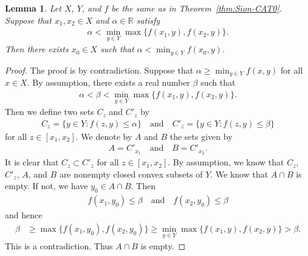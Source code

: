 \documentclass[draft]{amsart}
\numberwithin{equation}{section}
\def\R{\mathbb R}
\theoremstyle{plain}
\newtheorem{lemma}[theorem]{Lemma}
\theoremstyle{definition}
\theoremstyle{remark}
\begin{document}
\begin{lemma}\label{lem:Sion-CAT0-1}
 Let $X$, $Y$, and $f$ be the same as in Theorem~\ref{thm:Sion-CAT0}. 
 Suppose that $x_1,x_2\in X$ and $\alpha \in \R$ satisfy 
 \begin{align}
  \alpha < \min_{y\in Y}\max\{f(x_1, y), f(x_2, y)\}. 
 \end{align}
 Then there exists $x_0\in X$ such that 
 $\alpha < \min_{y\in Y}f(x_0,y)$. 
\end{lemma}

\begin{proof}
 The proof is by contradiction. Suppose that 
 $\alpha \geq \min_{y\in Y}f(x, y)$ 
 for all $x\in X$. 
 By assumption, there exists a real number $\beta$ such that 
 \begin{align}
  \alpha < \beta < \min_{y\in Y}\max\{f(x_1, y), f(x_2, y)\}. 
 \end{align}
 Then we define two sets $C_z$ and $C'_z$ by 
 \begin{align}
  C_z = \{y\in Y: f(z,y) \leq \alpha\} 
  \quad \textrm{and} \quad 
  C'_z = \{y\in Y: f(z,y) \leq \beta\} 
 \end{align}
 for all $z\in [x_1,x_2]$. We denote by $A$ and $B$ the sets given by 
 \begin{align}
  A=C'_{x_1} \quad \textrm{and}\quad B=C'_{x_2}. 
 \end{align}
 It is clear that $C_z\subset C'_z$ for all $z\in [x_1,x_2]$. 
 By assumption, we know that $C_z$, $C'_z$, $A$, and $B$ are 
 nonempty closed convex subsets of $Y$. 
 We know that $A\cap B$ is empty. 
 If not, we have $y_0\in A\cap B$. Then 
\begin{align}
 f(x_1,y_0)\leq \beta \quad \textrm{and} \quad 
 f(x_2,y_0) \leq \beta
\end{align}
 and hence 
 \begin{align}
  \beta 
& \geq \max \{f(x_1,y_0), f(x_2,y_0)\} 
 \geq \min_{y\in Y}\max \{f(x_1,y), f(x_2,y)\} >\beta. 
 \end{align}
 This is a contradiction. Thus $A\cap B$ is empty. 
 

\end{proof}
\end{document}
